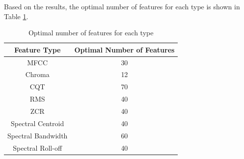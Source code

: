 Based on the results, the optimal number of features for each type is shown in Table \ref{tab:optimal_features}.
\begin{table}[h]
    \centering
    \small
    \begin{tabular}{|c|c|}
        \hline
        \textbf{Feature Type} & \textbf{Optimal Number of Features} \\
        \hline
        MFCC                  & 30                                  \\
        Chroma                & 12                                  \\
        CQT                   & 70                                  \\
        RMS                   & 40                                  \\
        ZCR                   & 40                                  \\
        Spectral Centroid     & 40                                  \\
        Spectral Bandwidth    & 60                                  \\
        Spectral Roll-off     & 40                                  \\
        \hline
    \end{tabular}
    \caption{Optimal number of features for each type}
    \label{tab:optimal_features}
\end{table}

